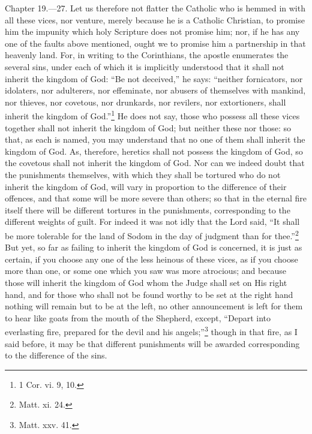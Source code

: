 Chapter 19.—27. Let us therefore not flatter the Catholic who is hemmed in with all these vices, nor venture, merely because he is a Catholic Christian, to promise him the impunity which holy Scripture does not promise him; nor, if he has any one of the faults above mentioned, ought we to promise him a partnership in that heavenly land. For, in writing to the Corinthians, the apostle enumerates the several sins, under each of which it is implicitly understood that it shall not inherit the kingdom of God: ``Be not deceived,'' he says: ``neither fornicators, nor idolaters, nor adulterers, nor effeminate, nor abusers of themselves with mankind, nor thieves, nor covetous, nor drunkards, nor revilers, nor extortioners, shall inherit the kingdom of God.''\footnote{\par  1 Cor. vi. 9, 10.} He does not say, those who possess all these vices together shall not inherit the kingdom of God; but neither these nor those: so that, as each is named, you may understand that no one of them shall inherit the kingdom of God. As, therefore, heretics shall not possess the kingdom of God, so the covetous shall not inherit the kingdom of God. Nor can we indeed doubt that the punishments themselves, with which they shall be tortured who do not inherit the kingdom of God, will vary in proportion to the difference of their offences, and that some will be more severe than others; so that in the eternal fire itself there will be different tortures in the punishments, corresponding to the different weights of guilt. For indeed it was not idly that the Lord said, ``It shall be more tolerable for the land of Sodom in the day of judgment than for thee.''\footnote{\par  Matt. xi. 24.} But yet, so far as failing to inherit the kingdom of God is concerned, it is just as certain, if you choose any one of the less heinous of these vices, as if you choose more than one, or some one which you saw was more atrocious; and because those will inherit the kingdom of God whom the Judge shall set on His right hand, and for those who shall not be found worthy to be set at the right hand nothing will remain but to be at the left, no other announcement is left for them to hear like goats from the mouth of the Shepherd, except, ``Depart into everlasting fire, prepared for the devil and his angels;''\footnote{\par  Matt. xxv. 41.} though in that fire, as I said before, it may be that different punishments will be awarded corresponding to the difference of the sins.

